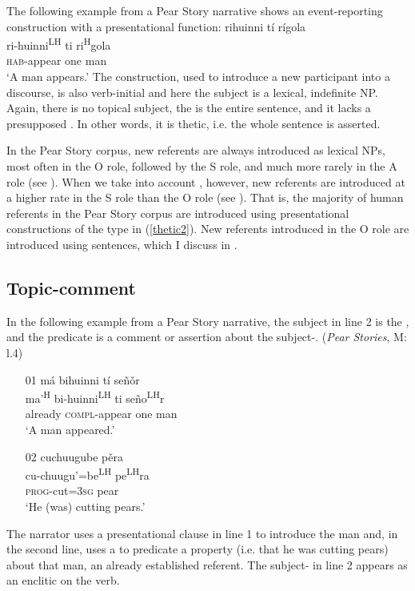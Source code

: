 The following example from a Pear Story narrative shows an event-reporting construction with a presentational function:
\ea\label{thetic2} 
\glll rihuinni t\'{i} r\'{i}gola  \\
ri-huinni\textsuperscript{LH} ti ri\textsuperscript{H}gola  \\
\textsc{hab}-appear one man  \\
\glt `A man appears.' 
\z
The construction, used to introduce a new participant into a discourse, is also verb-initial and here the subject is a lexical, indefinite NP. Again, there is no topical subject, the  is the entire sentence, and it lacks a presupposed . In other words, it is thetic, i.e. the whole sentence is asserted. 

In the Pear Story corpus, new referents are always introduced as lexical NPs, most often in the O role, followed by the S role, and much more rarely in the A role (see ). When we take into account , however, new referents are introduced at a higher rate in the S role than the O role (see ). That is, the majority of human referents in the Pear Story corpus are introduced using presentational constructions of the type in (\ref{thetic2}). New referents introduced in the O role are introduced using  sentences, which I discuss in .


\subsection{Topic-comment}\label{topiccommentsection}

In the following example from a Pear Story narrative, the subject in line 2 is the , and the predicate is a comment or assertion about the subject-. 
\ea\label{TC} (\textit{Pear Stories}, M: l.4)
\begin{itemize}
\item[01]
\glll m\'{a} bihuinni t\'{i} se\~{n}\v{o}r \\
ma'\textsuperscript{H} bi-huinni\textsuperscript{LH} ti se\~{n}o\textsuperscript{LH}r \\
already \textsc{compl}-appear one man \\
\glt `A man appeared.' 


\item[02]
\glll cuchuugube p\v{e}ra \\
cu-chuugu'=be\textsuperscript{LH} pe\textsuperscript{LH}ra \\
\textsc{prog}-cut=\textsc{3sg} pear \\
\glt `He (was) cutting pears.' 

\end{itemize}
\z
The narrator uses a presentational clause in line 1 to introduce the man and, in the second line, uses a  to predicate a property (i.e. that he was cutting pears) about that man, an already established referent. The subject- in line 2 appears as an enclitic on the verb. 

